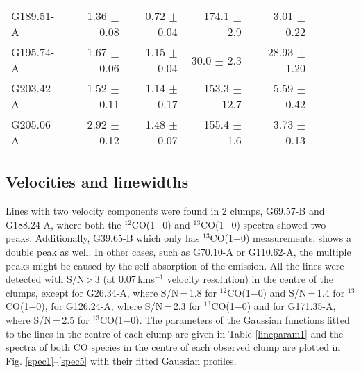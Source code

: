 \documentclass[printer]{aa}
\begin{document}
\begin{table}[t]
{\begin{tabular}{l r r r r r r r r}
G189.51-A & 1.36 $\pm$ 0.08 & 0.72 $\pm$ 0.04 & 174.1 $\pm$   2.9 &  3.01 $\pm$  0.22 \\
G195.74-A & 1.67 $\pm$ 0.06 & 1.15 $\pm$ 0.04 &  30.0 $\pm$   2.3 & 28.93 $\pm$  1.20 \\
G203.42-A & 1.52 $\pm$ 0.11 & 1.14 $\pm$ 0.17 & 153.3 $\pm$  12.7 &  5.59 $\pm$  0.42 \\
G205.06-A & 2.92 $\pm$ 0.12 & 1.48 $\pm$ 0.07 & 155.4 $\pm$   1.6 &  3.73 $\pm$  0.13 \\
  \hline
			\end{tabular}}
	\label{gauss}
\end{table}

\subsection{Velocities and linewidths}

\label{res:vellinewidth}

Lines with two velocity components were found in 2 clumps, G69.57-B and G188.24-A, where both the $^{12}$CO(1$-$0) and $^{13}$CO(1$-$0) spectra showed two peaks. Additionally, G39.65-B which only has $^{13}$CO(1$-$0) measurements, shows a double peak as well. In other cases, such as G70.10-A or G110.62-A, the multiple peaks might be caused by the self-absorption of the emission. All the lines were detected with S/N\,>\,3 (at 0.07\,kms$^{-1}$ velocity resolution) in the centre of the clumps, except for G26.34-A, where S/N\,=\,1.8 for $^{12}$CO(1$-$0) and S/N\,=\,1.4 for $^{13}$CO(1$-$0), for G126.24-A, where S/N\,=\,2.3 for $^{13}$CO(1$-$0) and for G171.35-A, where S/N\,=\,2.5 for $^{13}$CO(1$-$0). The parameters of the Gaussian functions fitted to the lines in the centre of each clump are given in Table \ref{lineparam1} and the spectra of both CO species in the centre of each observed clump are plotted in Fig. \ref{spec1}--\ref{spec5} with their fitted Gaussian profiles. 
\end{document}
